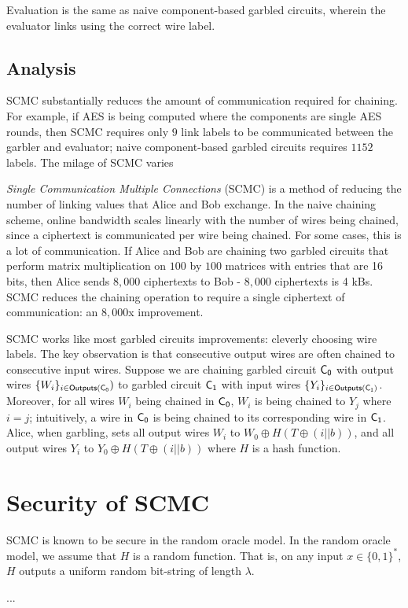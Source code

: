 Evaluation is the same as naive component-based garbled circuits, wherein the evaluator links using the correct wire label.

\subsection{Analysis}
SCMC substantially reduces the amount of communication required for chaining. 
For example, if AES is being computed where the components are single AES rounds, then SCMC requires only $9$ link labels to be communicated between the garbler and evaluator; naive component-based garbled circuits requires $1152$ labels. 
The milage of SCMC varies

\al{-}

\textit{Single Communication Multiple Connections} (SCMC) is a method of reducing the number of linking values that Alice and Bob exchange.
In the naive chaining scheme, online bandwidth scales linearly with the number of wires being chained, since a ciphertext is communicated per wire being chained.
For some cases, this is a lot of communication.
If Alice and Bob are chaining two garbled circuits that perform matrix multiplication on $100$ by $100$ matrices with entries that are 16 bits, then Alice sends $8,000$ ciphertexts to Bob - $8,000$ ciphertexts is 4 kBs.
SCMC reduces the chaining operation to require a single ciphertext of communication: an $8,000$x improvement.

SCMC works like most garbled circuits improvements: cleverly choosing wire labels.
The key observation is that consecutive output wires are often chained to consecutive input wires.
Suppose we are chaining garbled circuit $\sf {C}_0$ with output wires $\{W_i\}_{i \in {\sf {Outputs}}(\sf {C}_0})$ to garbled circuit $\sf {C}_1$ with input wires $\{Y_i\}_{i \in {\sf {Outputs}}(\sf {C}_1)}$.
Moreover, for all wires $W_i$ being chained in $\sf {C}_0$, $W_i$ is being chained to $Y_j$ where $i = j$; intuitively, a wire in $\sf {C}_0$ is being chained to its corresponding wire in $\sf {C}_1$.
Alice, when garbling, sets all output wires $W_i$ to $W_0 \oplus H(T \oplus (i || b))$, and all output wires $Y_i$ to $Y_0 \oplus H(T \oplus (i || b))$ where $H$ is a hash function.

\section{Security of SCMC}
SCMC is known to be secure in the random oracle model.
In the random oracle model, we assume that $H$ is a random function.
That is, on any input $x \in \{0,1\}^*$, $H$ outputs a uniform random bit-string of length $\lambda$.

...























